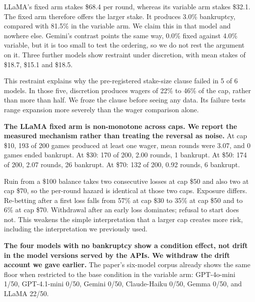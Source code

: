 \vspace{0.3em}
\vspace{0.6em}

LLaMA's fixed arm stakes \$68.4 per round, whereas its variable arm stakes \$32.1. The fixed arm
therefore offers the larger stake. It produces 3.0\% bankruptcy, compared with 81.5\% in the
variable arm. We claim this in that model and nowhere else. Gemini's contrast points the same
way, 0.0\% fixed against 4.0\% variable, but it is too small to test the ordering, so we do not
rest the argument on it. Three further models show restraint under discretion, with mean stakes
of \$18.7, \$15.1 and \$18.5.

This restraint explains why the pre-registered stake-size clause failed in 5 of 6 models. In those
five, discretion produces wagers of 22\% to 46\% of the cap, rather than more than half. We froze
the clause before seeing any data. Its failure tests range expansion more severely than the wager
comparison alone.

\textbf{The LLaMA fixed arm is non-monotone across caps. We report the measured mechanism rather
than treating the reversal as noise.} At cap \$10, 193 of 200 games produced at least one wager,
mean rounds were 3.07, and 0 games ended bankrupt. At \$30: 170 of 200, 2.00 rounds, 1 bankrupt. At
\$50: 174 of 200, 2.07 rounds, 26 bankrupt. At \$70: 132 of 200, 0.92 rounds, 6 bankrupt.

Ruin from a \$100 balance takes two consecutive losses at cap \$50 and also two at cap \$70, so the
per-round hazard is identical at those two caps. Exposure differs. Re-betting after a first loss
falls from 57\% at cap \$30 to 35\% at cap \$50 and to 6\% at cap \$70. Withdrawal after an early
loss dominates; refusal to start does not. This weakens the simple interpretation that a larger cap
creates more risk, including the interpretation we previously used.

\textbf{The four models with no bankruptcy show a condition effect, not drift in the model versions
served by the APIs. We withdraw the drift account we gave earlier.} The paper's six-model corpus
already shows the same floor when restricted to the base condition in the variable arm: GPT-4o-mini
1/50, GPT-4.1-mini 0/50, Gemini 0/50, Claude-Haiku 0/50, Gemma 0/50, and LLaMA 22/50.

